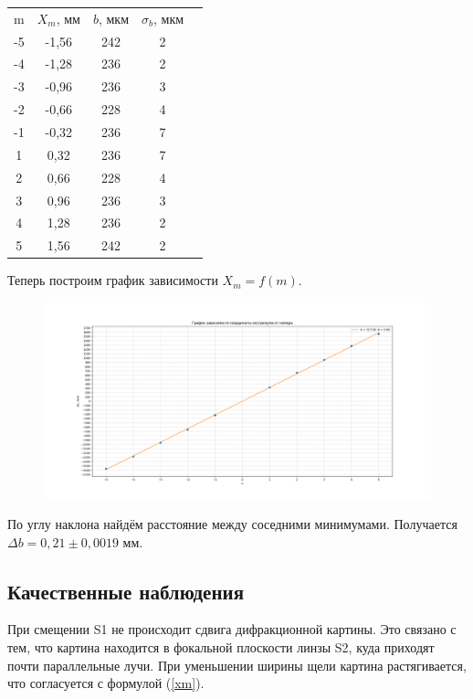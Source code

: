 \documentclass[a4paper,12pt]{article}
\begin{document}
\begin{table}[H]
    \centering
    \begin{tabular}{ccccc}
      m  & $X_m$, мм  & $b$, мкм & $\sigma_b$, мкм \\
      -5   & -1,56  & 242  & 2 \\
      -4   & -1,28  & 236  & 2 \\
      -3   & -0,96  & 236  & 3 \\
      -2   & -0,66  & 228  & 4 \\
      -1   & -0,32  & 236  & 7 \\
       1   &  0,32  & 236  & 7 \\
       2   &  0,66  & 228  & 4 \\
       3   &  0,96  & 236  & 3 \\
       4   &  1,28  & 236  & 2 \\
       5   &  1,56  & 242  & 2 \\
    \end{tabular}
    \label{tab:my_label1}
\end{table}

Теперь построим график зависимости $X_m = f(m)$.

\begin{figure}[H]
	\centering
	\includegraphics[scale=0.4]{Figure_1.png}
	\label{graph1}
\end{figure}

По углу наклона найдём расстояние между соседними минимумами. Получается $\Delta	b = 0,21 \pm 0,0019$ мм.

\subsection{Качественные наблюдения}
При смещении S1 не происходит сдвига дифракционной картины. 
Это связано с тем, что картина находится в фокальной плоскости 
линзы S2, куда приходят почти параллельные лучи. При уменьшении 
ширины щели картина растягивается, что согласуется с формулой 
(\ref{xm}).
\end{document}
